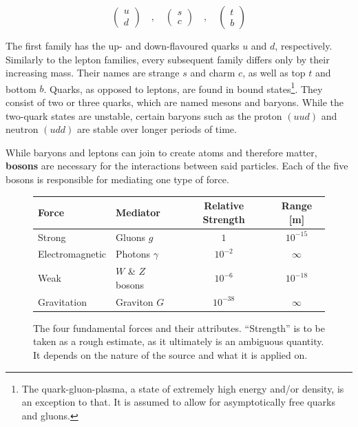 \begin{equation*}
  \begin{pmatrix}
    u \\
    d
  \end{pmatrix}
  \quad , \quad
  \begin{pmatrix}
    s \\
    c
  \end{pmatrix}
  \quad , \quad
  \begin{pmatrix}
    t \\
    b
  \end{pmatrix}
\end{equation*}

The first family has the up- and down-flavoured quarks $u$ and $d$, respectively. Similarly to the lepton families, every subsequent family differs only by their increasing mass. Their names are strange $s$ and charm $c$, as well as top $t$ and bottom $b$. Quarks, as opposed to leptons, are found in bound states\footnote{The quark-gluon-plasma, a state of extremely high energy and/or density, is an exception to that. It is assumed to allow for asymptotically free quarks and gluons.}. They consist of two or three quarks, which are named mesons and baryons. While the two-quark states are unstable, certain baryons such as the proton $(uud)$ and neutron $(udd)$ are stable over longer periods of time.


While baryons and leptons can join to create atoms and therefore matter, \textbf{bosons} are necessary for the interactions between said particles. Each of the five bosons is responsible for mediating one type of force.

\begin{figure}[!htb]
  \centering
  \begin{tabular}{|l|l|c|c|}
    \hline
    Force           & Mediator          & Relative Strength & Range [m]  \\ \hline
    Strong          & Gluons $g$        & $1$               & $10^{-15}$ \\
    Electromagnetic & Photons $\gamma$  & $10^{-2}$         & $\infty$   \\
    Weak            & $W$ \& $Z$ bosons & $10^{-6}$         & $10^{-18}$ \\
    Gravitation     & Graviton $G$      & $10^{-38}$        & $\infty$   \\
    \hline  
  \end{tabular}
  \caption{The four fundamental forces and their attributes. ``Strength'' is to be taken as a rough estimate, as it ultimately is an ambiguous quantity. It depends on the nature of the source and what it is applied on.}
  \label{tab:fundforces}
\end{figure}

